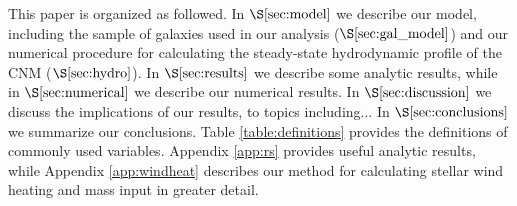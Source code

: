 \documentclass[usenatbib,fleqn]{mn2e}
\begin{document}
This paper is organized as followed.  In $\S\ref{sec:model}$ we
describe our model, including the sample of galaxies used in our
analysis ($\S\ref{sec:gal_model}$) and our numerical procedure for
calculating the steady-state hydrodynamic profile of the CNM
($\S\ref{sec:hydro}$).  In $\S\ref{sec:results}$ we describe some
analytic results, while in $\S\ref{sec:numerical}$ we describe our numerical results.  In $\S\ref{sec:discussion}$ we discuss the implications of our results, to topics including...   In $\S\ref{sec:conclusions}$ we summarize our conclusions.  Table \ref{table:definitions} provides the definitions of commonly used variables.  Appendix \ref{app:rs} provides useful analytic results, while Appendix \ref{app:windheat} describes our method for calculating stellar wind heating and mass input in greater detail.  
\end{document}
